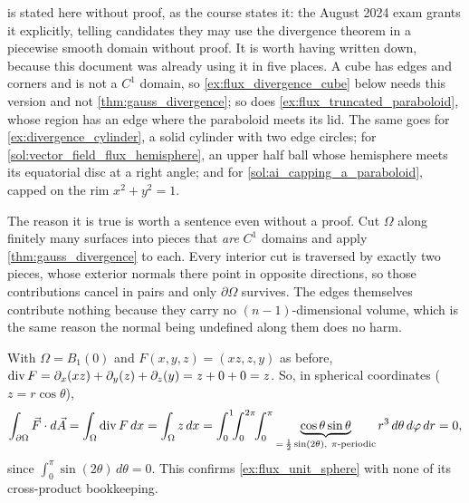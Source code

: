 \begin{ainote}
 is stated here without proof, as the course states it: the
August 2024 exam grants it explicitly, telling candidates they may use the divergence theorem in a
piecewise smooth domain without proof. It is worth having written down, because this document was
already using it in five places. A cube has edges and corners and is not a $C^1$ domain, so
\cref{ex:flux_divergence_cube} below needs this version and not
\cref{thm:gauss_divergence}; so does \cref{ex:flux_truncated_paraboloid}, whose region has an edge
where the paraboloid meets its lid. The same goes for \cref{ex:divergence_cylinder}, a solid
cylinder with two edge circles; for \cref{sol:vector_field_flux_hemisphere}, an upper half ball
whose hemisphere meets its equatorial disc at a right angle; and for
\cref{sol:ai_capping_a_paraboloid}, capped on the rim $x^2+y^2=1$.

The reason it is true is worth a sentence even without a proof. Cut $\Omega$ along finitely many
surfaces into pieces that \emph{are} $C^1$ domains and apply \cref{thm:gauss_divergence} to each.
Every interior cut is traversed by exactly two pieces, whose exterior normals there point in
opposite directions, so those contributions cancel in pairs and only $\partial\Omega$ survives.
The edges themselves contribute nothing because they carry no $(n-1)$-dimensional volume, which is
the same reason the normal being undefined along them does no harm.
\end{ainote}

\begin{example}
\label{ex:flux_unit_sphere_via_divergence}
With $\Omega = B_1(0)$ and $F(x,y,z) = (xz,z,y)$ as before, $\operatorname{div} F = \partial_x(xz) +
\partial_y(z) + \partial_z(y) = z + 0 + 0 = z$. So, in spherical coordinates ($z =
r\cos\theta$),
\[
\int_{\partial\Omega} \vec F\cdot d\vec A = \int_\Omega \operatorname{div} F\,dx = \int_\Omega z\,dx
  = \int_0^1\!\!\int_0^{2\pi}\!\!\int_0^\pi \underbrace{\cos\theta\sin\theta}_{=\,\frac12\sin(2\theta),\
    \pi\text{-periodic}} r^3\,d\theta\,d\varphi\,dr = 0,
\]
since $\int_0^\pi \sin(2\theta)\,d\theta = 0$. This confirms \cref{ex:flux_unit_sphere} with none
of its cross-product bookkeeping.
\end{example}

